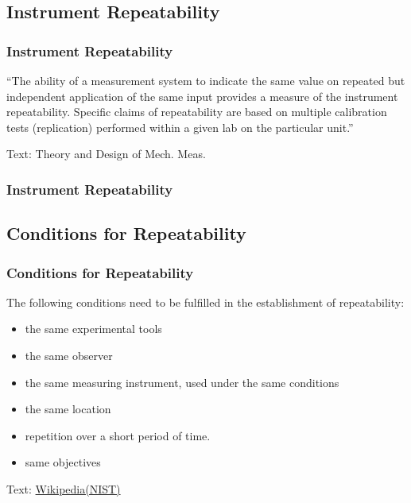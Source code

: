 \documentclass[fleqn]{beamer} %
\newcommand{\sectionIIIsubsectionItitle}{Instrument Repeatability}
\newcommand{\sectionIIIsubsectionIItitle}{Conditions for Repeatability}
\begin{document}
		\subsection{\sectionIIIsubsectionItitle}\label{sectionIIIsubsectionI}

			\begin{frame}
				\frametitle{\sectionIIIsubsectionItitle}

				
				``The ability of a measurement system to indicate the same value on repeated but independent
				application of the same input provides a measure of the instrument {\PN repeatability}. Specific claims of
				{\PN repeatability} are based on multiple calibration tests (replication) performed within a given lab on the
				particular unit.'' \vspc

				\begin{framed}\hspace{10mm}\end{framed}

				\vspace{10mm}

				{\tiny Text: Theory and Design of Mech. Meas.}
				
			\end{frame}

			\begin{frame}
				\frametitle{\sectionIIIsubsectionItitle}
		
			\end{frame}

		\subsection{\sectionIIIsubsectionIItitle}\label{sectionIIIsubsectionII}	

			\begin{frame}
				\frametitle{\sectionIIIsubsectionIItitle}

				The following conditions need to be fulfilled in the establishment of repeatability:
				\begin{itemize}

					\item the same experimental tools
					\item the same observer
					\item the same measuring instrument, used under the same conditions
					\item the same location
					\item repetition over a short period of time.
					\item same objectives

				\end{itemize}
				\vspace{5mm}
				{\tiny Text: \href{https://en.wikipedia.org/wiki/Repeatability}{Wikipedia(NIST)} }

			\end{frame}
\end{document}
